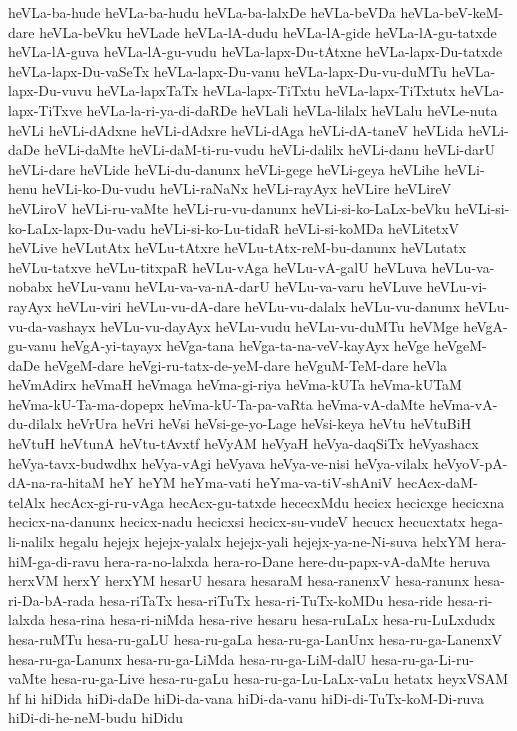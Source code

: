 {heVLa-ba-hude
heVLa-ba-hudu
heVLa-ba-lalxDe
heVLa-beVDa
heVLa-beV-keM-dare
heVLa-beVku
heVLade
heVLa-lA-dudu
heVLa-lA-gide
heVLa-lA-gu-tatxde
heVLa-lA-guva
heVLa-lA-gu-vudu
heVLa-lapx-Du-tAtxne
heVLa-lapx-Du-tatxde
heVLa-lapx-Du-vaSeTx
heVLa-lapx-Du-vanu
heVLa-lapx-Du-vu-duMTu
heVLa-lapx-Du-vuvu
heVLa-lapxTaTx
heVLa-lapx-TiTxtu
heVLa-lapx-TiTxtutx
heVLa-lapx-TiTxve
heVLa-la-ri-ya-di-daRDe
heVLali
heVLa-lilalx
heVLalu
heVLe-nuta
heVLi
heVLi-dAdxne
heVLi-dAdxre
heVLi-dAga
heVLi-dA-taneV
heVLida
heVLi-daDe
heVLi-daMte
heVLi-daM-ti-ru-vudu
heVLi-dalilx
heVLi-danu
heVLi-darU
heVLi-dare
heVLide
heVLi-du-danunx
heVLi-gege
heVLi-geya
heVLihe
heVLi-henu
heVLi-ko-Du-vudu
heVLi-raNaNx
heVLi-rayAyx
heVLire
heVLireV
heVLiroV
heVLi-ru-vaMte
heVLi-ru-vu-danunx
heVLi-si-ko-LaLx-beVku
heVLi-si-ko-LaLx-lapx-Du-vadu
heVLi-si-ko-Lu-tidaR
heVLi-si-koMDa
heVLitetxV
heVLive
heVLutAtx
heVLu-tAtxre
heVLu-tAtx-reM-bu-danunx
heVLutatx
heVLu-tatxve
heVLu-titxpaR
heVLu-vAga
heVLu-vA-galU
heVLuva
heVLu-va-nobabx
heVLu-vanu
heVLu-va-va-nA-darU
heVLu-va-varu
heVLuve
heVLu-vi-rayAyx
heVLu-viri
heVLu-vu-dA-dare
heVLu-vu-dalalx
heVLu-vu-danunx
heVLu-vu-da-vashayx
heVLu-vu-dayAyx
heVLu-vudu
heVLu-vu-duMTu
heVMge
heVgA-gu-vanu
heVgA-yi-tayayx
heVga-tana
heVga-ta-na-veV-kayAyx
heVge
heVgeM-daDe
heVgeM-dare
heVgi-ru-tatx-de-yeM-dare
heVguM-TeM-dare
heVla
heVmAdirx
heVmaH
heVmaga
heVma-gi-riya
heVma-kUTa
heVma-kUTaM
heVma-kU-Ta-ma-dopepx
heVma-kU-Ta-pa-vaRta
heVma-vA-daMte
heVma-vA-du-dilalx
heVrUra
heVri
heVsi
heVsi-ge-yo-Lage
heVsi-keya
heVtu
heVtuBiH
heVtuH
heVtunA
heVtu-tAvxtf
heVyAM
heVyaH
heVya-daqSiTx
heVyashacx
heVya-tavx-budwdhx
heVya-vAgi
heVyava
heVya-ve-nisi
heVya-vilalx
heVyoV-pA-dA-na-ra-hitaM
heY
heYM
heYma-vati
heYma-va-tiV-shAniV
hecAcx-daM-telAlx
hecAcx-gi-ru-vAga
hecAcx-gu-tatxde
hececxMdu
hecicx
hecicxge
hecicxna
hecicx-na-danunx
hecicx-nadu
hecicxsi
hecicx-su-vudeV
hecucx
hecucxtatx
hega-li-nalilx
hegalu
hejejx
hejejx-yalalx
hejejx-yali
hejejx-ya-ne-Ni-suva
helxYM
hera-hiM-ga-di-ravu
hera-ra-no-lalxda
hera-ro-Dane
here-du-papx-vA-daMte
heruva
herxVM
herxY
herxYM
hesarU
hesara
hesaraM
hesa-ranenxV
hesa-ranunx
hesa-ri-Da-bA-rada
hesa-riTaTx
hesa-riTuTx
hesa-ri-TuTx-koMDu
hesa-ride
hesa-ri-lalxda
hesa-rina
hesa-ri-niMda
hesa-rive
hesaru
hesa-ruLaLx
hesa-ru-LuLxdudx
hesa-ruMTu
hesa-ru-gaLU
hesa-ru-gaLa
hesa-ru-ga-LanUnx
hesa-ru-ga-LanenxV
hesa-ru-ga-Lanunx
hesa-ru-ga-LiMda
hesa-ru-ga-LiM-dalU
hesa-ru-ga-Li-ru-vaMte
hesa-ru-ga-Live
hesa-ru-gaLu
hesa-ru-ga-Lu-LaLx-vaLu
hetatx
heyxVSAM
hf
hi
hiDida
hiDi-daDe
hiDi-da-vana
hiDi-da-vanu
hiDi-di-TuTx-koM-Di-ruva
hiDi-di-he-neM-budu
hiDidu
}
